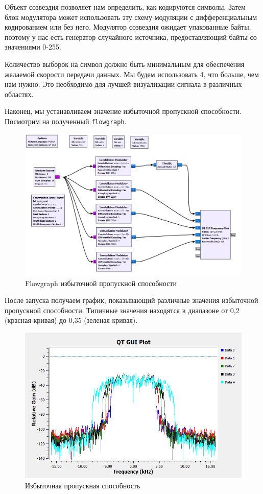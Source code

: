 \documentclass[a4paper, 14pt]{extarticle}
\begin{document}
    Объект созвездия позволяет нам определить, как кодируются символы.
    Затем блок модулятора может использовать эту схему модуляции с дифференциальным кодированием или без него.
    Модулятор созвездия ожидает упакованные байты, поэтому у нас есть генератор случайного источника, предоставляющий байты со значениями 0-255.

    Количество выборок на символ должно быть минимальным для обеспечения желаемой скорости передачи данных.
    Мы будем использовать 4, что больше, чем нам нужно.
    Это необходимо для лучшей визуализации сигнала в различных областях.

    Наконец, мы устанавливаем значение избыточной пропускной способности.
    Посмотрим на полученный \texttt{flowgraph}.

    \begin{figure}[H]
        \centering
        \includegraphics[width=0.8\linewidth]{flowgraph}
        \caption{Flowgraph избыточной пропускной способности}
        \label{fig:flowgraph}
    \end{figure}

    После запуска получаем график, показывающий различные значения избыточной пропускной способности.
    Типичные значения находятся в диапазоне от 0,2 (красная кривая) до 0,35 (зеленая кривая).

    \begin{figure}[H]
        \centering
        \includegraphics[width=0.8\linewidth]{flowgraph_wave}
        \caption{Избыточная пропускная способность}
        \label{fig:flowgraph_wave}
    \end{figure}
\end{document}
